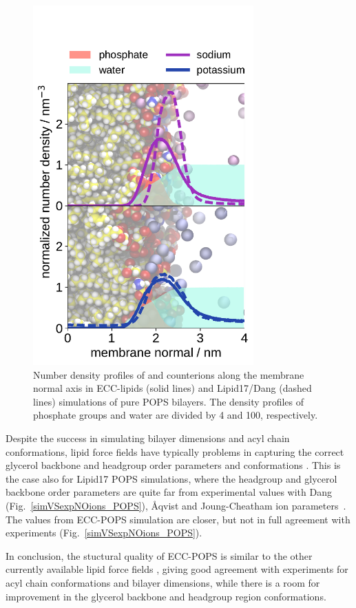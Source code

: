 \documentclass[journal=jctcce,manuscript=article]{achemso}
\begin{document}
\begin{figure}[tbp!] 
  \centering 
  \includegraphics[width=3.33in]{../img/ecc_pops/density_profiles_na-k-counterions_wat_phos_compar_purePOPS_ecclipids-lipid17.pdf}
  \caption{\label{fig:POPS-counterions-dens}
    Number density profiles of  and  counterions along the membrane normal axis
    in ECC-lipids (solid lines) and Lipid17/Dang (dashed lines) simulations of pure POPS bilayers.  
    The density profiles of phosphate groups and water are divided by 4 and 100, respectively.  
  }
\end{figure}


Despite the success in simulating bilayer dimensions and acyl chain conformations,
lipid force fields have typically problems in capturing the correct glycerol backbone and
headgroup order parameters and conformations \cite{botan15,ollila16,NMRlipidsIV}.
This is the case also for Lipid17 POPS simulations, where the headgroup and glycerol backbone
order parameters are quite far from experimental values with Dang (Fig.~\ref{simVSexpNOions_POPS}),
{\AA}qvist and Joung-Cheatham ion parameters~\cite{NMRlipidsIV}. The values from ECC-POPS simulation are closer,
but not in full agreement with experiments (Fig.~\ref{simVSexpNOions_POPS}).

In conclusion, the stuctural quality of ECC-POPS is similar to the other currently available
lipid force fields \cite{botan15, catte16, Pluhackova2016,NMRlipidsIV},
giving good agreement with experiments for acyl chain conformations and bilayer dimensions,
while there is a room for improvement in the glycerol backbone and headgroup region
conformations.
 
\end{document}

